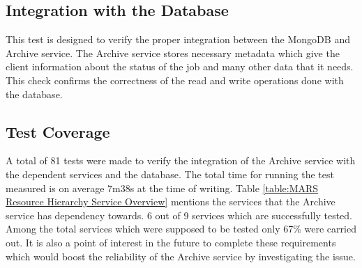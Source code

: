 \subsection{Integration with the Database}
This test is designed to verify the proper integration between the MongoDB and Archive service. The Archive service stores necessary metadata
which give the client information about the status of the job and many other data that it needs. This check confirms the correctness of the read and write 
operations done with the database. 

\subsection{Test Coverage}
A total of 81 tests were made to verify the integration of the Archive service with the dependent services and the database. The 
total time for running the test measured is on average 7m38s at the time of writing. Table \ref{table:MARS Resource Hierarchy Service Overview}
mentions the services that the Archive service has dependency towards. 6 out of 9 services which are successfully tested. Among the total services 
which were supposed to be tested only 67\%  were carried out. It is also a point of interest in the future to complete these requirements which would boost the
reliability of the Archive service by investigating the issue.  
